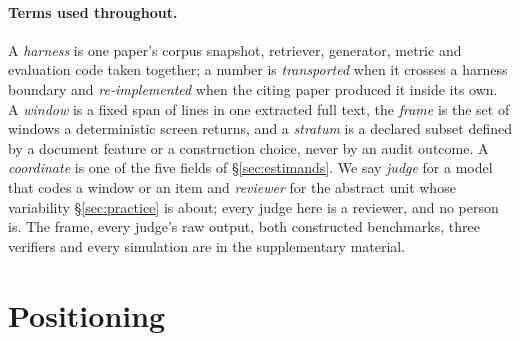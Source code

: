\documentclass[11pt]{article}
\begin{document}
\paragraph{Terms used throughout.}
A \emph{harness} is one paper's corpus snapshot, retriever, generator, metric
and evaluation code taken together; a number is \emph{transported} when it
crosses a harness boundary and \emph{re-implemented} when the citing paper
produced it inside its own. A \emph{window} is a fixed span of lines in one
extracted full text, the \emph{frame} is the set of windows a deterministic
screen returns, and a \emph{stratum} is a declared subset defined by a document
feature or a construction choice, never by an audit outcome. A
\emph{coordinate} is one of the five fields of \S\ref{sec:estimands}. We say
\emph{judge} for a model that codes a window or an item and \emph{reviewer} for
the abstract unit whose variability \S\ref{sec:practice} is about; every judge
here is a reviewer, and no person is. The frame, every judge's raw output, both
constructed benchmarks, three verifiers and every simulation are in the
supplementary material.

\section{Positioning}
\label{sec:related}
\end{document}
